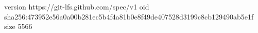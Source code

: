 version https://git-lfs.github.com/spec/v1
oid sha256:473952e56a0a00b281ec5b4f4a81b0e8f49de407528d3199c8cb129490ab5e1f
size 5566
